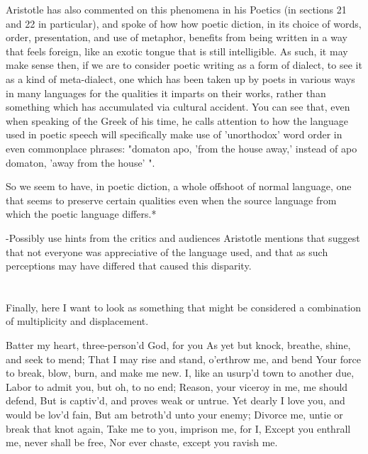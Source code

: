 \documentclass[]{article}
\begin{document}
Aristotle has also commented on this phenomena in his Poetics (in sections 21 and 22 in particular), and spoke of how how poetic diction, in its choice of words, order, presentation, and use of metaphor, benefits from being written in a way that feels foreign, like an exotic tongue that is still intelligible. As such, it may make sense then, if we are to consider poetic writing as a form of dialect, to see it as a kind of meta-dialect, one which has been taken up by poets in various ways in many languages for the qualities it imparts on their works, rather than something which has accumulated via cultural accident. You can see that, even when speaking of the Greek of his time, he calls attention to how the language used in poetic speech will specifically make use of 'unorthodox' word order in even commonplace phrases: "domaton apo, 'from the house away,' instead of apo domaton, 'away from the house' ".





So we seem to have, in poetic diction, a whole offshoot of normal language, one that seems to preserve certain qualities even when the source language from which the poetic language differs.*



-Possibly use hints from the critics and audiences Aristotle mentions that suggest that not everyone was appreciative of the language used, and that as such perceptions may have differed that caused this disparity.



\section{}



Finally, here I want to look as something that might be considered a combination of multiplicity and displacement.



Batter my heart, three-person'd God, for you 
As yet but knock, breathe, shine, and seek to mend; 
That I may rise and stand, o'erthrow me, and bend 
Your force to break, blow, burn, and make me new. 
I, like an usurp'd town to another due, 
Labor to admit you, but oh, to no end; 
Reason, your viceroy in me, me should defend, 
But is captiv'd, and proves weak or untrue. 
Yet dearly I love you, and would be lov'd fain, 
But am betroth'd unto your enemy; 
Divorce me, untie or break that knot again, 
Take me to you, imprison me, for I, 
Except you enthrall me, never shall be free, 
Nor ever chaste, except you ravish me.
\end{document}
